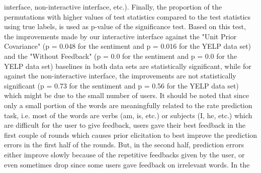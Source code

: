 \documentclass{sig-alternate}
\begin{document}
interface, non-interactive interface, etc.). Finally, the proportion
of the permutations with higher values of test statistics compared
to the test statistics using true labels, is used as p-value of the
significance test. Based on this test, the improvements made by our
interactive interface against the "Unit Prior Covariance" (p = 0.048
for the sentiment and p = 0.016 for the YELP data set) and the
"Without Feedback" (p = 0.0 for the sentiment and p = 0.0 for the
YELP data set)  baselines in both data sets are statistically significant, while for against the non-interactive interface, the improvements
are not statistically significant (p = 0.73 for the sentiment and
p = 0.56 for the YELP data set) which might be due to the small
number of users.
It should be noted that since only a small portion of the words
are meaningfully related to the rate prediction task, i.e. most of
the words are verbs (am, is, etc.) or subjects (I, he, etc.) which are
difficult for the user to give feedback, users gave their best feedback
in the first couple of rounds which causes prior elicitation to best
improve the prediction errors in the first half of the rounds. But, in
the second half, prediction errors either improve slowly because
of the repetitive feedbacks given by the user, or even sometimes
drop since some users gave feedback on irrelevant words. In the
\end{document}
